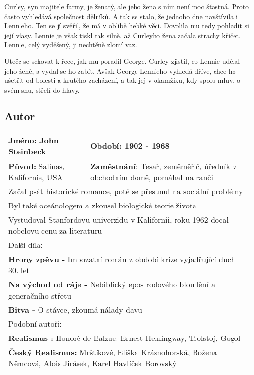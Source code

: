 Curley, syn majitele farmy, je ženatý, ale jeho žena s ním není moc šťastná.
Proto často vyhledává společnost dělníků.
A tak se stalo, že jednoho dne navštívila i Lennieho.
Ten se jí svěřil, že má v oblibě hebké věci.
Dovolila mu tedy pohladit si její vlasy.
Lennie je však tiskl tak silně, až Curleyho žena začala strachy křičet.
Lennie, celý vyděšený, ji nechtěně zlomí vaz.

Uteče se schovat k řece, jak mu poradil George.
Curley zjistil, co Lennie udělal jeho ženě, a vydal se ho zabít.
Avšak George Lennieho vyhledá dříve, chce ho ušetřit od bolesti a krutého zacházení, a tak jej v okamžiku, kdy spolu mluví o svém snu, střelí do hlavy.
\subsection*{Autor}
\begin{tabularx}{\linewidth}{l|l}
  \textbf{Jméno:} John Steinbeck           & \textbf{Období:} 1902 - 1968                                                              \\
  \hline
  \textbf{Původ:} Salinas, Kalifornie, USA & \textbf{Zaměstnání:} Tesař, zeměměřič, úředník v obchodním domě, pomáhal na ranči         \\
  \hline
  \multicolumn{2}{l}{Začal psát historické romance, poté se přesunul na sociální problémy}                                             \\
  \multicolumn{2}{l}{Byl také oceánologem a zkousel biologické teorie života}                                                          \\
  \multicolumn{2}{l}{Vystudoval Stanfordovu univerzidu v Kalifornii, roku 1962 docal nobelovu cenu za literaturu}                      \\
  \hline
  \multicolumn{2}{l}{Další díla:}                                                                                                      \\
  \multicolumn{2}{l}{\textbf{Hrony zpěvu -} Impozatní román z období krize vyjadřující duch 30. let}                                   \\
  \multicolumn{2}{l}{\textbf{Na východ od ráje -} Nebiblický epos rodového bloudění a generačního střetu}                              \\
  \multicolumn{2}{l}{\textbf{Bitva -} O stávce, zkoumá nálady davu}                                                                    \\
  \hline
  \multicolumn{2}{l}{Podobní autoři:}                                                                                                  \\
  \multicolumn{2}{l}{\textbf{Realismus :} Honoré de Balzac, Ernest Hemingway, Trolstoj, Gogol}                                         \\
  \multicolumn{2}{l}{\textbf{Český Realismus:} Mrštíkové, Eliška Krásnohorská, Božena Němcová, Alois Jirásek, Karel Havlíček Borovský} \\
\end{tabularx}
